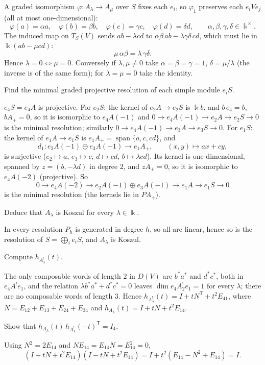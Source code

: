 \documentclass[11pt,a4paper]{exam}
\newcommand{\kk}{\Bbbk}
\begin{document}
\begin{questions}
\begin{parts}
\begin{subparts}
\begin{solution}
A graded isomorphism $\varphi:A_\lambda\to A_\mu$ over $S$ fixes each $e_i$, so $\varphi_1$ preserves each $e_iVe_j$ (all at most one-dimensional):
\[
  \varphi(a)=\alpha a,\quad\varphi(b)=\beta b,\quad\varphi(c)=\gamma c,\quad\varphi(d)=\delta d,\qquad\alpha,\beta,\gamma,\delta\in\kk^\times.
\]
The induced map on $T_S(V)$ sends $ab-\lambda cd$ to $\alpha\beta\,ab-\lambda\gamma\delta\,cd$, which must lie in $\kk(ab-\mu cd)$:
\[
  \mu\,\alpha\beta=\lambda\,\gamma\delta.
\]
Hence $\lambda=0\Leftrightarrow\mu=0$.
Conversely if $\lambda,\mu\neq0$ take $\alpha=\beta=\gamma=1$, $\delta=\mu/\lambda$ (the inverse is of the same form); for $\lambda=\mu=0$ take the identity.
\end{solution}
\subpart Find the minimal graded projective resolution of each simple module $e_iS$.
\begin{solution}
$e_4S=e_4A$ is projective.
For $e_2S$: the kernel of $e_2A\to e_2S$ is $\kk b$, and $b\,e_4=b$, $bA_+=0$, so it is isomorphic to $e_4A(-1)$ and $0\to e_4A(-1)\to e_2A\to e_2S\to0$ is the minimal resolution; similarly $0\to e_4A(-1)\to e_3A\to e_3S\to0$.
For $e_1S$: the kernel of $e_1A\to e_1S$ is $e_1A_+=\operatorname{span}\{a,c,cd\}$, and
\[
d_1:e_2A(-1)\oplus e_3A(-1)\to e_1A_+,\qquad(x,y)\mapsto ax+cy,
\]
is surjective ($e_2\mapsto a$, $e_3\mapsto c$, $d\mapsto cd$, $b\mapsto\lambda cd$).
Its kernel is one-dimensional, spanned by $z=(b,-\lambda d)$ in degree $2$, and $zA_+=0$, so it is isomorphic to $e_4A(-2)$ (projective).
So
\[
0\to e_4A(-2)\to e_2A(-1)\oplus e_3A(-1)\to e_1A\to e_1S\to0
\]
is the minimal resolution (the kernels lie in $PA_+$).
\end{solution}
\subpart Deduce that $A_\lambda$ is Koszul for every $\lambda\in\kk$.
\begin{solution}
In every resolution $P_h$ is generated in degree $h$, so all are linear, hence so is the resolution of $S=\bigoplus_ie_iS$, and $A_\lambda$ is Koszul.
\end{solution}
\subpart Compute $h_{A_\lambda^!}(t)$.
\begin{solution}
The only composable words of length $2$ in $D(V)$ are $b^*a^*$ and $d^*c^*$, both in $e_4A^!e_1$, and the relation $\lambda b^*a^*+d^*c^*=0$ leaves $\dim e_4A^!_2e_1=1$ for every $\lambda$; there are no composable words of length $3$.
Hence $h_{A_\lambda^!}(t)=I+tN^{\mathsf T}+t^2E_{41}$, where $N=E_{12}+E_{13}+E_{24}+E_{34}$ and $h_{A_\lambda}(t)=I+tN+t^2E_{14}$.
\end{solution}
\subpart Show that $h_{A_\lambda}(t)\,h_{A_\lambda^!}(-t)^{\mathsf T}=I_4$.
\begin{solution}
Using $N^2=2E_{14}$ and $NE_{14}=E_{14}N=E_{14}^2=0$,
\[
  (I+tN+t^2E_{14})(I-tN+t^2E_{14})=I+t^2(E_{14}-N^2+E_{14})=I.
\]
\end{solution}
\end{subparts}



\end{parts}
\end{questions}
\end{document}

